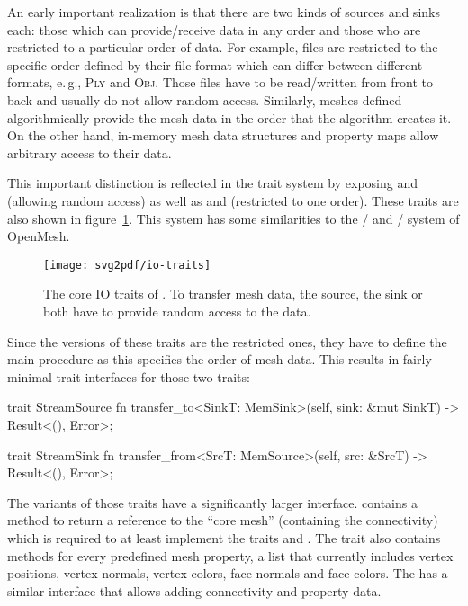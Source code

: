 An early important realization is that there are two kinds of sources and sinks each: those which can provide/receive data in any order and those who are restricted to a particular order of data.
For example, files are restricted to the specific order defined by their file format which can differ between different formats, e.\,g., \textsc{Ply} and \textsc{Obj}.
Those files have to be read/written from front to back and usually do not allow random access.
Similarly, meshes defined algorithmically provide the mesh data in the order that the algorithm creates it.
On the other hand, in-memory mesh data structures and property maps allow arbitrary access to their data.

This important distinction is reflected in the trait system by exposing  and  (allowing random access) as well as  and  (restricted to one order).
These traits are also shown in figure~\ref{fig:io-traits}.
This system has some similarities to the / and / system of OpenMesh.

\begin{figure}[t]
  \centering
  \texttt{[image: svg2pdf/io-traits]}
  \caption{
    The core IO traits of .
    To transfer mesh data, the source, the sink or both have to provide random access to the
    data.
  }
  \label{fig:io-traits}
\end{figure}

\newpage

Since the  versions of these traits are the restricted ones, they have to define the main procedure as this specifies the order of mesh data.
This results in fairly minimal trait interfaces for those two traits:

\begin{rustcode}
  trait StreamSource {
      fn transfer_to<SinkT: MemSink>(self, sink: &mut SinkT) -> Result<(), Error>;
  }

  trait StreamSink {
      fn transfer_from<SrcT: MemSource>(self, src: &SrcT) -> Result<(), Error>;
  }
\end{rustcode}

The  variants of those traits have a significantly larger interface.
 contains a method to return a reference to the \enquote{core mesh} (containing the connectivity) which is required to at least implement the traits  and .
The trait also contains methods for every predefined mesh property, a list that currently includes vertex positions, vertex normals, vertex colors, face normals and face colors.
The  has a similar interface that allows adding connectivity and property data.

